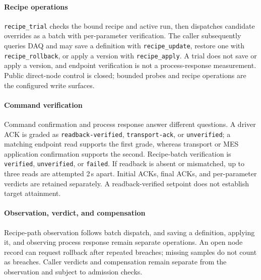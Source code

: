 \paragraph{Recipe operations}
\texttt{recipe\_trial} checks the bound recipe and active run, then dispatches
candidate overrides as a batch with per-parameter verification. The caller
subsequently queries DAQ and may save a definition with
\texttt{recipe\_update}, restore one with \texttt{recipe\_rollback}, or apply
a version with \texttt{recipe\_apply}. A trial does not save or apply a
version, and endpoint verification is not a process-response measurement.
Public direct-node control is closed; bounded probes and recipe operations are
the configured write surfaces.

\paragraph{Command verification}
Command confirmation and process response answer different questions. A
driver ACK is graded as \texttt{readback-verified}, \texttt{transport-ack},
or \texttt{unverified}; a matching endpoint read supports the first grade,
whereas transport or MES application confirmation supports the second.
Recipe-batch verification is \texttt{verified}, \texttt{unverified}, or
\texttt{failed}. If readback is absent or mismatched, up to three reads are
attempted 2\,s apart. Initial ACKs, final ACKs, and per-parameter verdicts are
retained separately. A readback-verified setpoint does not establish target
attainment.

\paragraph{Observation, verdict, and compensation}
Recipe-path observation follows batch dispatch, and saving a definition,
applying it, and observing process response remain separate operations. An
open node record can request rollback after repeated breaches; missing samples
do not count as breaches. Caller verdicts and compensation remain separate
from the observation and subject to admission checks.
\label{sec:agentloop}
